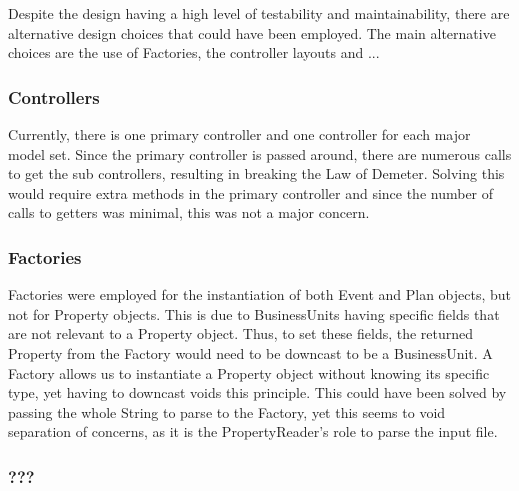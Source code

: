 \documentclass[]{article}
\begin{document}
Despite the design having a high level of testability and maintainability, there are alternative design choices that could have been employed. The main alternative choices are the use of Factories, the controller layouts and ...

\subsubsection*{Controllers}
Currently, there is one primary controller and one controller for each major model set. Since the primary controller is passed around, there are numerous calls to get the sub controllers, resulting in breaking the Law of Demeter. Solving this would require extra methods in the primary controller and since the number of calls to getters was minimal, this was not a major concern.

\subsubsection*{Factories}
Factories were employed for the instantiation of both Event and Plan objects, but not for Property objects. This is due to BusinessUnits having specific fields that are not relevant to a Property object. Thus, to set these fields, the returned Property from the Factory would need to be downcast to be a BusinessUnit. A Factory allows us to instantiate a Property object without knowing its specific type, yet having to downcast voids this principle. This could have been solved by passing the whole String to parse to the Factory, yet this seems to void separation of concerns, as it is the PropertyReader's role to parse the input file.

\subsubsection*{???}

\end{document}

